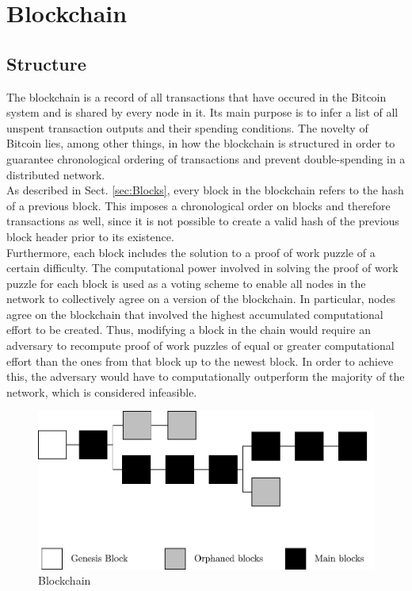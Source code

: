 \section{Blockchain} \label{sec:Blockchain}

\subsection{Structure} \label{sec:BlockchainStructure}
The blockchain is a record of all transactions that have occured in the Bitcoin system and is shared by every node in it. Its main purpose is to infer a list of all unspent transaction outputs and their spending conditions. The novelty of Bitcoin lies, among other things, in how the blockchain is structured in order to guarantee chronological ordering of transactions and prevent double-spending in a distributed network.~\\

\noindent
As described in Sect. \ref{sec:Blocks}, every block in the blockchain refers to the hash of a previous block. This imposes a chronological order on blocks and therefore transactions as well, since it is not possible to create a valid hash of the previous block header prior to its existence.~\\

\noindent
Furthermore, each block includes the solution to a proof of work puzzle of a certain difficulty. The computational power involved in solving the proof of work puzzle for each block is used as a voting scheme to enable all nodes in the network to collectively agree on a version of the blockchain. In particular, nodes agree on the blockchain that involved the highest accumulated computational effort to be created. Thus, modifying a block in the chain would require an adversary to recompute proof of work puzzles of equal or greater computational effort than the ones from that block up to the newest block. In order to achieve this, the adversary would have to computationally outperform the majority of the network, which is considered infeasible.

\begin{figure}[ht!]
 \centering
 \includegraphics[scale=0.8]{Images/Blockchain.pdf}
 
 \vspace{5pt}
 \caption{Blockchain}
 \label{figure:Blockchain}
\end{figure}

